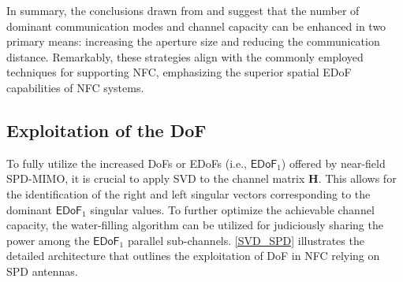\documentclass[journal]{IEEEtran}
\theoremstyle{definition}
\begin{document}
In summary, the conclusions drawn from \cite{Miller2000} and \cite{Dardari2020} suggest that the number of dominant communication modes and channel capacity
can be enhanced in two primary means: increasing the aperture size and reducing the communication distance. Remarkably, these strategies align with the commonly employed techniques for supporting NFC, emphasizing the superior spatial EDoF capabilities of NFC systems.

\subsection{Exploitation of the DoF}
To fully utilize the increased DoFs or EDoFs (i.e., ${\mathsf{EDoF}}_1$) offered by near-field SPD-MIMO, it is crucial to apply SVD to the channel matrix $\mathbf{H}$. This allows for the identification of the right and left singular vectors corresponding to the dominant ${\mathsf{EDoF}}_1$ singular values. To further optimize the achievable channel capacity, the water-filling algorithm can be utilized for judiciously sharing the power among the ${\mathsf{EDoF}}_1$ parallel sub-channels. {\figurename} {\ref{SVD_SPD}} illustrates the detailed architecture that outlines the exploitation of DoF in NFC relying on SPD antennas.

\end{document}
